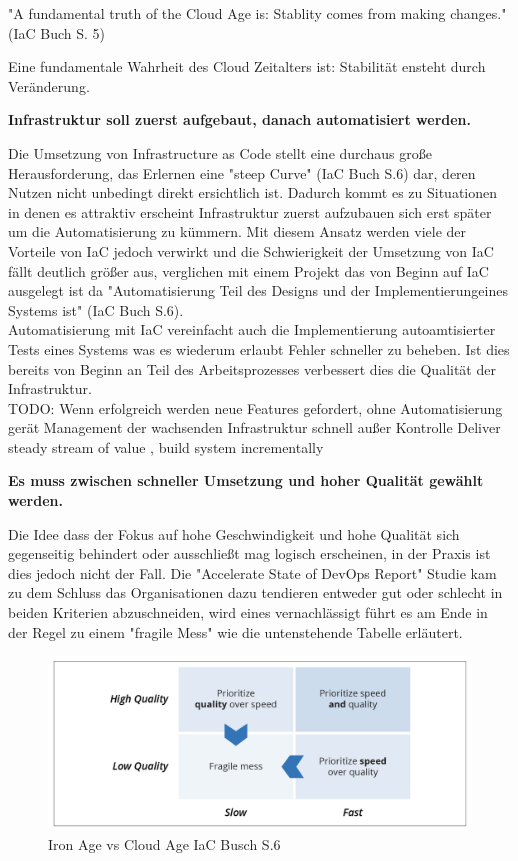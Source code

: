 "A fundamental truth of the Cloud Age is: Stablity comes from making changes."
(IaC Buch S. 5)

Eine fundamentale Wahrheit des Cloud Zeitalters ist: Stabilität ensteht durch
Veränderung.

\textbf{Infrastruktur soll zuerst aufgebaut, danach automatisiert werden.}

Die Umsetzung von Infrastructure as Code stellt eine durchaus große
Herausforderung, das Erlernen eine "steep Curve" (IaC Buch S.6) dar, deren
Nutzen nicht unbedingt direkt ersichtlich ist. Dadurch kommt es zu
Situationen in denen es attraktiv erscheint Infrastruktur zuerst aufzubauen
sich erst später um die Automatisierung zu kümmern. Mit diesem
Ansatz werden viele der Vorteile von IaC jedoch verwirkt und die Schwierigkeit
der Umsetzung von IaC fällt deutlich größer aus, verglichen mit einem
Projekt das von Beginn auf IaC ausgelegt ist da 
"Automatisierung Teil des Designs und der Implementierungeines Systems ist"
(IaC Buch S.6).\\
Automatisierung mit IaC vereinfacht auch die Implementierung autoamtisierter
Tests eines Systems was es wiederum erlaubt Fehler schneller zu beheben.
Ist dies bereits von Beginn an Teil des Arbeitsprozesses verbessert dies
die Qualität der Infrastruktur.\\

TODO: Wenn erfolgreich werden neue Features gefordert, ohne Automatisierung
gerät Management der wachsenden Infrastruktur schnell außer Kontrolle
Deliver steady stream of value , build system incrementally

\textbf{Es muss zwischen schneller Umsetzung und hoher Qualität
gewählt werden.}

Die Idee dass der Fokus auf hohe Geschwindigkeit und hohe Qualität
sich gegenseitig behindert oder ausschließt mag logisch erscheinen,
in der Praxis ist dies jedoch nicht der Fall.
Die "Accelerate State of DevOps Report" Studie kam zu dem Schluss
das Organisationen dazu tendieren entweder gut oder schlecht in beiden
Kriterien abzuschneiden, wird eines vernachlässigt führt es am Ende
in der Regel zu einem "fragile Mess" wie die untenstehende Tabelle
erläutert.

\begin{figure}[H]
  \includegraphics[width=1.0\textwidth]{fig/hauptteil/Speed_vs_Quality.png}
  \caption{Iron Age vs Cloud Age IaC Busch S.6}
  \centering
\end{figure}

